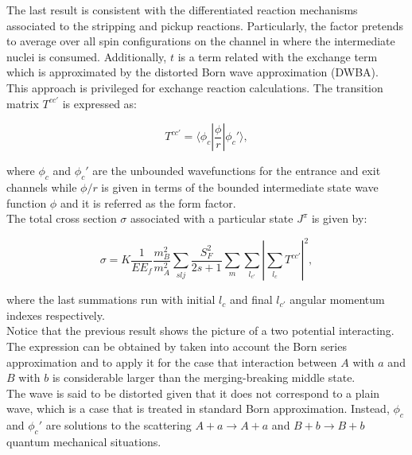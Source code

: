 \documentclass[openany]{book}
\begin{document}
The last result is consistent with the differentiated reaction mechanisms associated to the stripping and pickup reactions. Particularly, the factor pretends to average over all spin configurations on the channel in where the intermediate nuclei is consumed.  Additionally, $t$ is a term related with the exchange term which is approximated by the distorted Born wave approximation (DWBA). \\

This approach is privileged for exchange reaction calculations. The transition matrix $T^{cc'}$ is expressed as: 

\begin{equation}\label{eq:exchange_matrix}
	T^{cc'} = \langle  \phi_c | \frac{\phi}{r}|  \phi_c' \rangle,
\end{equation}

where $\phi_c $ and $\phi_c'$ are the unbounded wavefunctions for the entrance and exit channels while $\phi/r$ is given in terms of the bounded intermediate state wave function $\phi$ and it is referred as the form factor. \\

The total cross section $\sigma$ associated with a particular state $J^{\pi}$ is given by: 

\begin{equation} \label{eq:exchange_crossSection}
	\sigma = K \frac{1}{E E_f} \frac{m^2_B}{m^2_A} \sum_{slj} { \frac{S^2_F}{2s + 1}\sum_{m} \sum_{l_{c'}} \left|\sum_{l_{c}} T^{cc'}\right|^2},
\end{equation}

where the last summations run with initial $l_{c}$ and final $l_{c'}$ angular momentum indexes respectively. \\

Notice that the previous result shows the picture of a two potential interacting. The expression can be obtained by taken into account the Born series approximation and to apply it for the case that interaction between $A$ with $a$ and $B$ with $b$ is considerable larger than the merging-breaking middle state. \\

The wave is said to be distorted given that it does not correspond to a plain wave, which is a case that is treated in standard Born approximation. Instead,  $\phi_c $ and $\phi_c'$ are solutions to the scattering $A + a \rightarrow A + a$ and $B + b \rightarrow B + b$ quantum mechanical situations. \\
 
\end{document}
